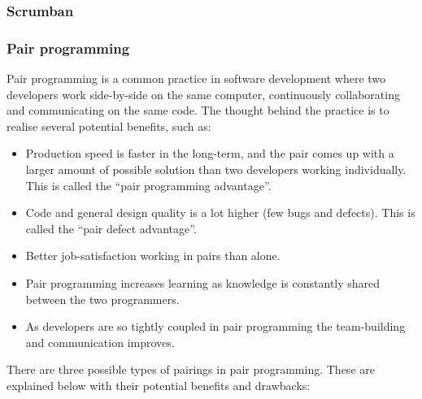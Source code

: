 \subsubsection{Scrumban}

\subsubsection{Pair programming}

Pair programming is a common practice in software development where two developers work side-by-side on the same computer, continuously collaborating and communicating on the same code. The thought behind the practice is to realise several potential benefits, such as:


\begin{itemize}
  \item Production speed is faster in the long-term, and the pair comes up with a larger amount of possible solution than two developers working individually. This is called the ``pair programming advantage''.
  \item Code and general design quality is a lot higher (few bugs and defects). This is called the ``pair defect advantage''.
  \item Better job-satisfaction working in pairs than alone.
  \item Pair programming increases learning as knowledge is constantly shared between the two programmers.
  \item As developers are so tightly coupled in pair programming the team-building and communication improves.
\end{itemize}

There are three possible types of pairings in pair programming. These are explained below with their potential benefits and drawbacks:

